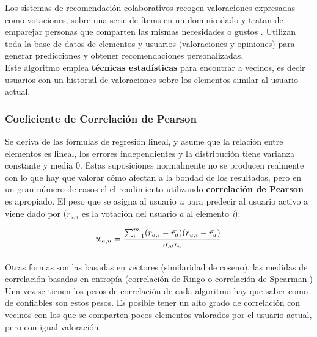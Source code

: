 \documentclass[12pt,letterpaper,oneside] {memoir}
\begin{document}
Los sistemas de recomendación colaborativos recogen valoraciones expresadas como votaciones, sobre una serie de ítems en un dominio dado y tratan de emparejar personas que comparten las mismas necesidades o gustos \citep{Adomavicius2005, Herlocker1991, Ramezani0000}. Utilizan toda la base de datos de elementos y usuarios (valoraciones y opiniones) para generar predicciones y obtener recomendaciones personalizadas.\\
Este algoritmo emplea \textbf{técnicas estadísticas} para encontrar a vecinos, es decir usuarios con un historial de valoraciones sobre los elementos similar al usuario actual.  

\subsubsection*{Coeficiente de Correlación de Pearson}

Se deriva de las fórmulas de regresión lineal, y asume que la relación entre elementos es lineal, los errores independientes y la distribución tiene varianza constante y media 0. Estas suposiciones normalmente no se producen realmente con lo que hay que valorar cómo afectan a la bondad de los resultados, pero en un gran número de casos el el rendimiento utilizando \textbf{correlación de Pearson} es apropiado. El peso que se asigna al usuario \textit{u} para predecir al usuario activo a viene dado por (\textit{$r_{a,i}$} es la votación del usuario \textit{a} al elemento \textit{i}):

\begin{equation}
\displaystyle w_{a,u} = {\sum_{i=1}^{m}( r_{a,i} - \bar{r_a} )(r_{u,i}- \bar{r_u}) \over \sigma_a \sigma_u }
\end{equation}
\paragraph{}
Otras formas son las basadas en vectores (similaridad de coseno), las medidas de correlación basadas en entropía (correlación de Ringo o correlación de Spearman.)\\
Una vez se tienen los pesos de correlación de cada algoritmo hay que saber como de confiables son estos pesos. Es posible tener un alto grado de correlación con vecinos con los que se comparten pocos elementos valorados por el usuario actual, pero con igual valoración. 
\end{document}

